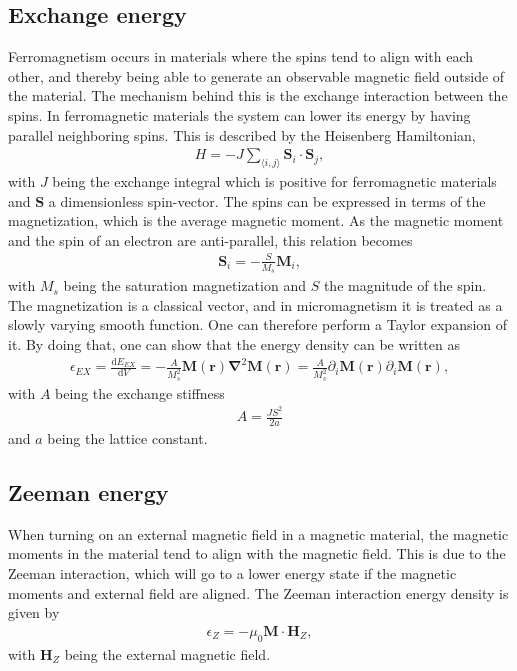 \subsection{Exchange energy} \label{sec:Exchange}
Ferromagnetism occurs in materials where the spins tend to align with each other, and thereby being able to generate an observable magnetic field outside of the material. The mechanism behind this is the exchange interaction between the spins. In ferromagnetic materials the system can lower its energy by having parallel neighboring spins. This is described by the Heisenberg Hamiltonian,
\begin{align}
H = - J\sum_{\langle i,j\rangle} \mathbold{S}_i\cdot\mathbold{S}_j,
\end{align}
with $J$ being the exchange integral which is positive for ferromagnetic materials and $\mathbold{S}$ a dimensionless spin-vector. The spins can be expressed in terms of the magnetization, which is the average magnetic moment. As the magnetic moment and the spin of an electron are anti-parallel, this relation becomes
\begin{align}
\label{eq:ExchangeHamiltonian}
\mathbold{S}_i = -\frac{S}{M_s}\mathbold{M}_i,
\end{align}
with $M_s$ being the saturation magnetization and $S$ the magnitude of the spin. The magnetization is a classical vector, and in micromagnetism it is treated as a slowly varying smooth function. One can therefore perform a Taylor expansion of it. By doing that, one can show \cite{Project} that the energy density can be written as
\begin{align}
\epsilon_{EX} = \frac{\textrm{d} E_{EX}}{\textrm{d} V} = -\frac{A}{M_s^2}\mathbold{M}(\mathbold{r})\mathbold{\nabla}^2\mathbold{M}(\mathbold{r}) = \frac{A}{M_s^2}\partial_i\mathbold{M}(\mathbold{r})\partial_i\mathbold{M}(\mathbold{r}), \label{eq:exchDensity}
\end{align}
with $A$ being the exchange stiffness
\begin{align}
A = \frac{J S^2}{2a}
\end{align}
and $a$ being the lattice constant.

\subsection{Zeeman energy}
When turning on an external magnetic field in a magnetic material, the magnetic moments in the material tend to align with the magnetic field. This is due to the Zeeman interaction, which will go to a lower energy state if the magnetic moments and external field are aligned. The Zeeman interaction energy density is given by
\begin{align}
\epsilon_Z = -\mu_0 \mathbold{M}\cdot\mathbold{H}_Z,
\end{align}
with $\mathbold{H}_Z$ being the external magnetic field.

